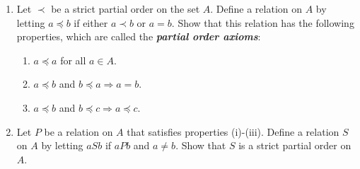 \documentclass[a4paper,12pt]{article}
\begin{document}
\begin{exe}\leavevmode \par
	\begin{enumerate}
		\item
		      Let \( \prec \) be a strict partial order on the set \( A \).
		      Define a relation on \( A \) by letting \( a \preceq b \)
		      if either \( a \prec b \) or \( a=b \).
		      Show that this relation has the following properties, which are called the 
		      \textbf{\textit{partial order axioms}}:
		      \begin{enumerate}
			      \item
			            \( a \preceq a \) for all \( a \in A \).
			            
			      \item
			            \( a \preceq b \) and \( b \preceq a \Rightarrow a=b\). 
			      \item
			            \( a \preceq b \) and \( b \preceq c \Rightarrow a \preceq c\). 
		      \end{enumerate}
		\item
		      Let \( P \) be a relation on \( A \) that satisfies properties (i)-(iii).
		      Define a relation \( S \) on \( A \) by letting \( aSb \) if \( aPb \) and \( a \neq b \).
		      Show that \( S \) is a strict partial order on \( A \).
	\end{enumerate}
\end{exe}
\end{document}
